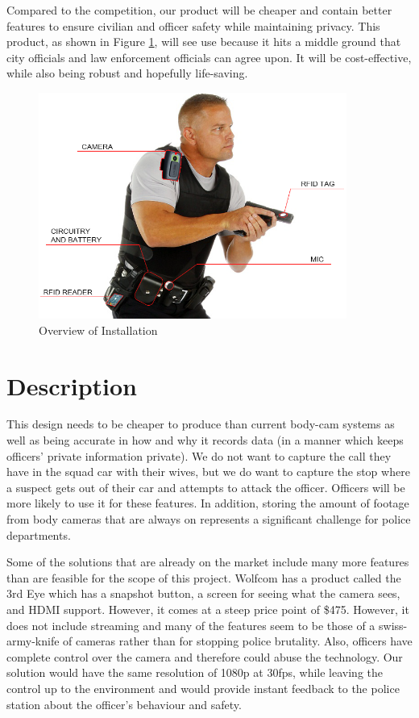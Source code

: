 \documentclass[12pt]{article}
\begin{document}
Compared to the competition, our product will be cheaper and contain better
features to ensure civilian and officer safety while maintaining privacy. This
product, as shown in Figure \ref{fig:installation},  will see use because it hits a middle ground that city officials and
law enforcement officials can agree upon. It will be cost-effective, while also
being robust and hopefully life-saving.

\begin{figure}[h!]
    \centering
    \includegraphics[width=0.9\textwidth]{installation}
    \caption{Overview of Installation}
    \label{fig:installation}
\end{figure}

\section{Description}

This design needs to be cheaper to produce than current body-cam systems as
well as being accurate in how and why it records data (in a manner which keeps
officers' private information private). We do not want to capture the call they
have in the squad car with their wives, but we do want to capture the stop
where a suspect gets out of their car and attempts to attack the officer.
Officers will be more likely to use it for these features. In addition, storing
the amount of footage from body cameras that are always on represents a significant
challenge for police departments\cite{store1,store2}.

Some of the solutions that are already on the market include many more features
than are feasible for the scope of this project. Wolfcom has a product called
the 3rd Eye\cite{third_eye} which has a snapshot button, a screen for seeing
what the camera sees, and HDMI support. However, it comes at a steep price
point of \$475.  However, it does not include streaming and many of the
features seem to be those of a swiss-army-knife of cameras rather than for
stopping police brutality. Also, officers have complete control over the camera
and therefore could abuse the technology. Our solution would have the same
resolution of 1080p at 30fps, while leaving the control up to the environment
and would provide instant feedback to the police station about the officer's
behaviour and safety.
\end{document}
